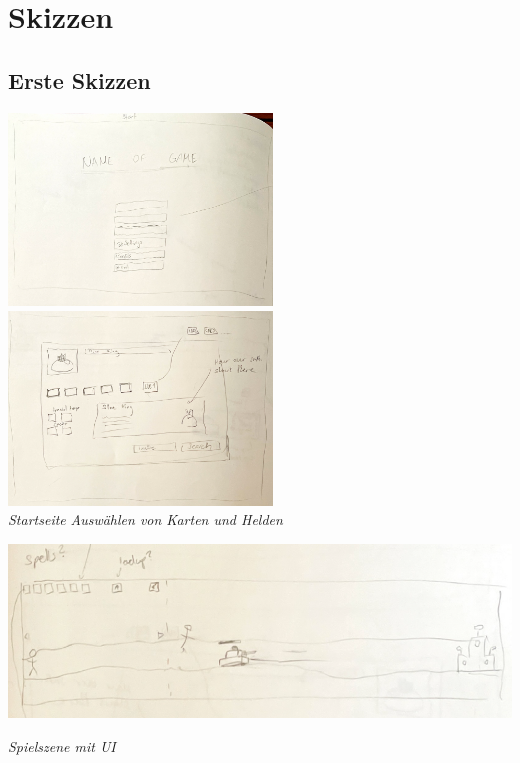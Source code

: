 \chapter{Skizzen}

\section{Erste Skizzen}

\includegraphics*[width=7cm]{resources/SK_startpage.png} \quad \includegraphics*[width=7cm]{resources/SK_auswahl.png}\\
\textit{Startseite} \qquad \qquad \qquad \qquad \qquad \qquad \qquad \quad \textit{Auswählen von Karten und Helden}
\\
\begin{center}
    \includegraphics*[width=14.5cm]{resources/sk_gamemain.png}\\
\end{center}
\textit{Spielszene mit UI}

